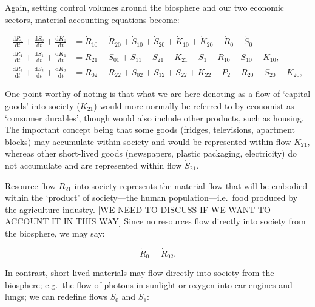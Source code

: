 Again, setting control volumes around the biosphere 
and our two economic sectors, material accounting equations become:

\begin{align} \label{eq:B_CV_0_to_2}
	\frac{\mathrm{d}R_{0}}{\mathrm{d}t} 
	+ \frac{\mathrm{d}S_{0}}{\mathrm{d}t}	
	+ \frac{\mathrm{d}K_0}{\mathrm{d}t}		&
	=  \dot{R}_{10} + \dot{R}_{20} 
	+ \dot{S}_{10} + \dot{S}_{20} 
	+ \dot{K}_{10} + \dot{K}_{20} 
	- \dot{R}_{0} 
	- \dot{S}_{0} 							\\
	\frac{\mathrm{d}R_{1}}{\mathrm{d}t} 
	+ \frac{\mathrm{d}S_{1}}{\mathrm{d}t}	
	+ \frac{\mathrm{d}K_{1}}{\mathrm{d}t}	&
	=  \dot{R}_{21} 
	+ \dot{S}_{01} 
	+ \dot{S}_{11} 
	+ \dot{S}_{21}
	+ \dot{K}_{21}
	- \dot{S}_{1} 
	- \dot{R}_{10} 
	- \dot{S}_{10} 
	- \dot{K}_{10},							\\
	\frac{\mathrm{d}R_{2}}{\mathrm{d}t} 
	+ \frac{\mathrm{d}S_{2}}{\mathrm{d}t}
	+ \frac{\mathrm{d}K_{2}}{\mathrm{d}t}	&
	=  \dot{R}_{02} 
	+ \dot{R}_{22} 
	+ \dot{S}_{02} 
	+ \dot{S}_{12} 
	+ \dot{S}_{22} 
	+ \dot{K}_{22}
	- \dot{P}_{2}
	- \dot{R}_{20} 
	- \dot{S}_{20} 
	- \dot{K}_{20},
\end{align}

One point worthy of noting is that what we are here denoting as a flow of `capital goods'
into society ($\dot{K}_{21}$) would more normally be referred to by economist as `consumer
durables', though would also include other products, such as housing. The important concept
being that some goods (fridges, televisions, apartment blocks) may accumulate within society
and would be represented within flow $\dot{K}_{21}$, whereas other short-lived goods
(newspapers, plastic packaging, electricity) do not accumulate and are represented within
flow $\dot{S}_{21}$.

Resource flow $\dot{R}_{21}$ into society represents the material flow that will be embodied
within the `product' of society---the human population---i.e.\ food produced by the agriculture
industry. [WE NEED TO DISCUSS IF WE WANT TO ACCOUNT IT IN THIS WAY]
Since no resources flow directly into society from the biosphere, we may say:

\begin{equation}
	\dot{R}_{0} = \dot{R}_{02}.
\end{equation}

In contrast, short-lived materials may flow directly into society from the biosphere; 
e.g.\ the flow of photons in sunlight or oxygen into car engines and lungs; 
we can redefine flows $\dot{S}_{0}$ and $\dot{S}_{1}$:

